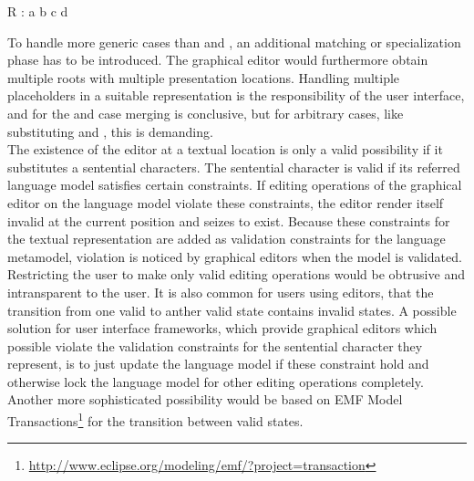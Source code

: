 \begin{xtxt}
R : a b c d
\end{xtxt}
To handle more generic cases than  and , an additional matching or specialization phase has to be introduced. The graphical editor would furthermore obtain multiple roots with multiple presentation locations. Handling multiple placeholders in a suitable representation is the responsibility of the user interface, and for the  and  case merging is conclusive, but for arbitrary cases, like substituting  and , this is demanding.\\
The existence of the editor at a textual location is only a valid possibility if it substitutes a sentential characters. The sentential character is valid if its referred language model satisfies certain constraints. If editing operations of the graphical editor on the language model violate these constraints, the editor render itself invalid at the current position and seizes to exist. Because these constraints for the textual representation are added as validation constraints for the language metamodel, violation is noticed by graphical editors when the model is validated. Restricting the user to make only valid editing operations would be obtrusive and intransparent to the user. It is also common for users using editors, that the transition from one valid to anther valid state contains invalid states. A possible solution for user interface frameworks, which provide graphical editors which possible violate the validation constraints for the sentential character they represent, is to just update the language model if these constraint hold and otherwise lock the language model for other editing operations completely. Another more sophisticated possibility would be based on EMF Model Transactions\footnote{\raggedright \url{http://www.eclipse.org/modeling/emf/?project=transaction}} for the transition between valid states.\\
